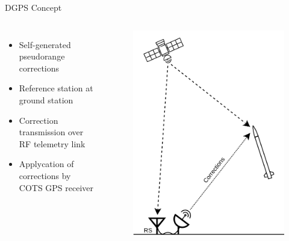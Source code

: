 \documentclass[12pt, compress, xcolor=table]{beamer}
\begin{document}
\begin{frame}{DGPS Concept}
 \begin{columns}
  
  \begin{itemize}
   \setlength\itemsep{0.5cm}
   \item Self-generated pseudorange corrections
   \item Reference station at ground station
   \item Correction transmission over RF telemetry link
   \item Applycation of corrections by COTS GPS receiver
  \end{itemize}
  
  \begin{figure}
   \includegraphics[width=\textwidth]{images/DGPS_Rocket_Concept.png}
  \end{figure}
  
 \end{columns}
\end{frame}
\end{document}
